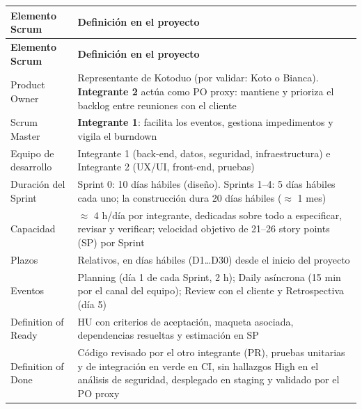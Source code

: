 \documentclass[11pt,a4paper]{article}
\begin{document}
\begingroup
\begin{longtable}{@{}>{\raggedright\arraybackslash\hspace{0pt}}p{}>{\raggedright\arraybackslash\hspace{0pt}}p{}@{}}
\toprule
\textbf{Elemento Scrum} & \textbf{Definición en el proyecto} \\ \midrule
\endfirsthead
\toprule
\textbf{Elemento Scrum} & \textbf{Definición en el proyecto} \\ \midrule
\endhead
\bottomrule
\endlastfoot
Product Owner & Representante de Kotoduo (por validar: Koto o Bianca). \textbf{Integrante 2} actúa como PO proxy: mantiene y prioriza el backlog entre reuniones con el cliente \\ \addlinespace[0.25em]
Scrum Master & \textbf{Integrante 1}: facilita los eventos, gestiona impedimentos y vigila el burndown \\ \addlinespace[0.25em]
Equipo de desarrollo & Integrante 1 (back-end, datos, seguridad, infraestructura) e Integrante 2 (UX/UI, front-end, pruebas) \\ \addlinespace[0.25em]
Duración del Sprint & Sprint 0: 10 días hábiles (diseño). Sprints 1--4: 5 días hábiles cada uno; la construcción dura 20 días hábiles (\ensuremath{\approx} 1 mes) \\ \addlinespace[0.25em]
\mbox{Capacidad} & \ensuremath{\approx} 4 h/día por integrante, dedicadas sobre todo a especificar, revisar y verificar; velocidad objetivo de 21--26 story points (SP) por Sprint \\ \addlinespace[0.25em]
\mbox{Plazos} & Relativos, en días hábiles (D1\ldots{}D30) desde el inicio del proyecto \\ \addlinespace[0.25em]
\mbox{Eventos} & Planning (día 1 de cada Sprint, 2 h); Daily asíncrona (15 min por el canal del equipo); Review con el cliente y Retrospectiva (día 5) \\ \addlinespace[0.25em]
Definition of Ready & HU con criterios de aceptación, maqueta asociada, dependencias resueltas y estimación en SP \\ \addlinespace[0.25em]
Definition of Done & Código revisado por el otro integrante (PR), pruebas unitarias y de integración en verde en CI, sin hallazgos High en el análisis de seguridad, desplegado en staging y validado por el PO proxy \\
\end{longtable}
\endgroup
\end{document}
